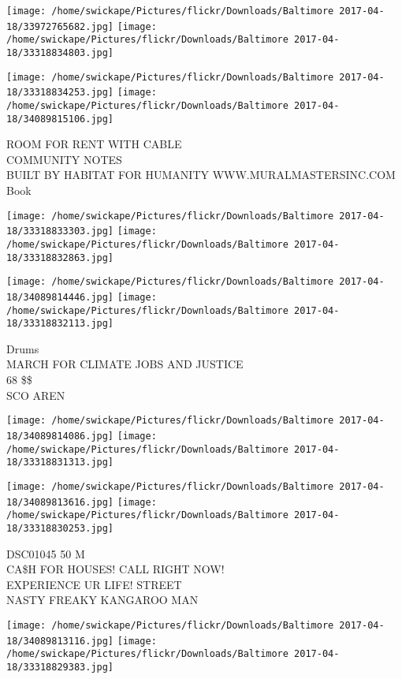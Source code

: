 \documentclass[10pt,letterpaper]{article}
\begin{document}
\texttt{[image: /home/swickape/Pictures/flickr/Downloads/Baltimore 2017-04-18/33972765682.jpg]}
\texttt{[image: /home/swickape/Pictures/flickr/Downloads/Baltimore 2017-04-18/33318834803.jpg]}

\texttt{[image: /home/swickape/Pictures/flickr/Downloads/Baltimore 2017-04-18/33318834253.jpg]}
\texttt{[image: /home/swickape/Pictures/flickr/Downloads/Baltimore 2017-04-18/34089815106.jpg]}

ROOM FOR RENT WITH CABLE\\
COMMUNITY NOTES\\
BUILT BY HABITAT FOR HUMANITY WWW.MURALMASTERSINC.COM\\
Book
\pagebreak

\texttt{[image: /home/swickape/Pictures/flickr/Downloads/Baltimore 2017-04-18/33318833303.jpg]}
\texttt{[image: /home/swickape/Pictures/flickr/Downloads/Baltimore 2017-04-18/33318832863.jpg]}

\texttt{[image: /home/swickape/Pictures/flickr/Downloads/Baltimore 2017-04-18/34089814446.jpg]}
\texttt{[image: /home/swickape/Pictures/flickr/Downloads/Baltimore 2017-04-18/33318832113.jpg]}

Drums\\
MARCH FOR CLIMATE JOBS AND JUSTICE\\
68 \$\$\\
SCO AREN
\pagebreak

\texttt{[image: /home/swickape/Pictures/flickr/Downloads/Baltimore 2017-04-18/34089814086.jpg]}
\texttt{[image: /home/swickape/Pictures/flickr/Downloads/Baltimore 2017-04-18/33318831313.jpg]}

\texttt{[image: /home/swickape/Pictures/flickr/Downloads/Baltimore 2017-04-18/34089813616.jpg]}
\texttt{[image: /home/swickape/Pictures/flickr/Downloads/Baltimore 2017-04-18/33318830253.jpg]}

DSC01045 50 M\\
CA\$H FOR HOUSES!  CALL RIGHT NOW!\\
EXPERIENCE UR LIFE! STREET\\
NASTY FREAKY KANGAROO MAN
\pagebreak

\texttt{[image: /home/swickape/Pictures/flickr/Downloads/Baltimore 2017-04-18/34089813116.jpg]}
\texttt{[image: /home/swickape/Pictures/flickr/Downloads/Baltimore 2017-04-18/33318829383.jpg]}
\end{document}

